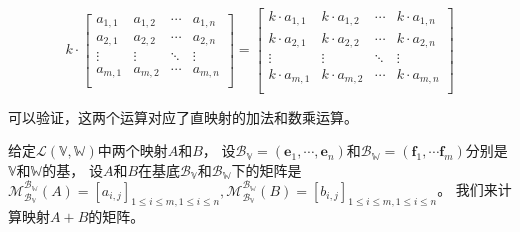 \documentclass[12pt,UTF8]{ctexbook}
\begin{document}
$$
    k\cdot\begin{bmatrix}
     a_{1,1}     & a_{1,2}   & \cdots & a_{1,n} \\
     a_{2,1}     & a_{2,2}   & \cdots & a_{2,n} \\
     \vdots      & \vdots    & \ddots & \vdots  \\
     a_{m,1}     & a_{m,2}   & \cdots & a_{m,n} \\
    \end{bmatrix}
    =
    \begin{bmatrix}
        k\cdot a_{1,1}     & k\cdot a_{1,2}   & \cdots & k\cdot a_{1,n} \\
        k\cdot a_{2,1}     & k\cdot a_{2,2}   & \cdots & k\cdot a_{2,n} \\
        \vdots      & \vdots    & \ddots & \vdots  \\
        k\cdot a_{m,1}     & k\cdot a_{m,2}   & \cdots & k\cdot a_{m,n} \\
    \end{bmatrix} 
$$

可以验证，这两个运算对应了直映射的加法和数乘运算。

给定$\mathcal{L}(\mathbb{V}, \mathbb{W})$中两个映射$A$和$B$，
设$\mathcal{B}_\mathbb{V} = (\mathbf{e}_1, \cdots, \mathbf{e}_n)$和$\mathcal{B}_\mathbb{W} = (\mathbf{f}_1, \cdots \mathbf{f}_m)$分别是$\mathbb{V}$和$\mathbb{W}$的基，
设$A$和$B$在基底$\mathcal{B}_\mathbb{V}$和$\mathcal{B}_\mathbb{W}$下的矩阵是
$\mathcal{M}_{\mathcal{B}_\mathbb{V}}^{\mathcal{B}_\mathbb{W}}(A) = [a_{i,j}]_{1\leqslant i\leqslant m, 1\leqslant i\leqslant n}, \mathcal{M}_{\mathcal{B}_\mathbb{V}}^{\mathcal{B}_\mathbb{W}}(B) = [b_{i,j}]_{1\leqslant i\leqslant m, 1\leqslant i\leqslant n}$。
我们来计算映射$A+B$的矩阵。
\end{document}
